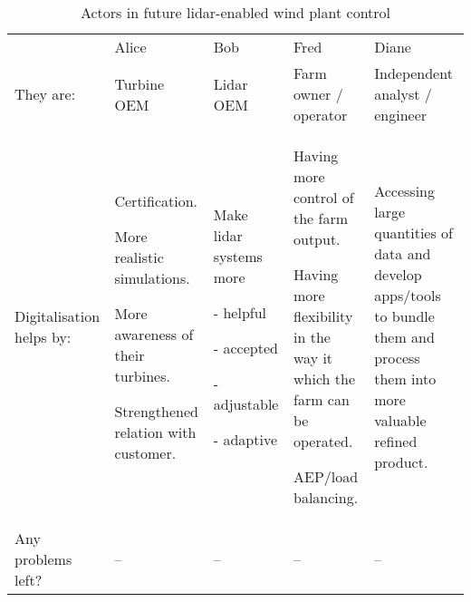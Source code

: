 \begin{table*}[!h]
    \centering
    \caption{Actors in future lidar-enabled wind plant control}
    \begin{tabular}{@{}|p{}|p{}|p{}|p{}|p{}|@{}}
    \rowcolor{Task32Blue2} & 
        Alice &
        Bob & 
        Fred & 
        Diane \\
They are: & 
    Turbine OEM & 
    Lidar OEM & 
    Farm owner / operator &
    Independent analyst / engineer \\
Digitalisation helps by: & 
    Certification.
    
    More realistic simulations.
    
    More awareness of their turbines.
    
    Strengthened relation with customer.&
    Make lidar systems more

    - helpful

    - accepted

    - adjustable

    - adaptive &
    Having more control of the farm output.
    
    Having more flexibility in the way it which the farm can be operated.

    AEP/load balancing. & 
    Accessing large quantities of data and develop apps/tools to bundle them and process them into more valuable refined product. \\

    Any problems left? & -- & -- & -- & -- \\
\end{tabular}
\label{tab:03_windPlantControl_future}
\end{table*}
